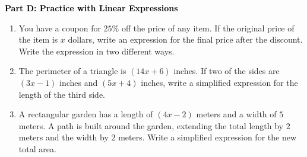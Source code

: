 \documentclass[12pt, letterpaper, fleqn]{article}
\begin{document}
\newpage

\begin{tcolorbox}[colback=customteal!20]
\large\textcolor{black}{\textbf{Part D: Practice with Linear Expressions}}
\end{tcolorbox}

\vspace{3mm}

\begin{enumerate}[itemsep=4.2cm, leftmargin=0.6cm, resume]
\item You have a coupon for $25\%$ off the price of any item. If the original price of the item is $x$ dollars, write an expression for the final price after the discount. Write the expression in two different ways.
\item The perimeter of a triangle is $(14x + 6)$ inches. If two of the sides are $(3x - 1)$ inches and $(5x + 4)$ inches, write a simplified expression for the length of the third side.
\item A rectangular garden has a length of $(4x - 2)$ meters and a width of $5$ meters. A path is built around the garden, extending the total length by $2$ meters and the width by $2$ meters. Write a simplified expression for the new total area.
\end{enumerate}
\end{document}
